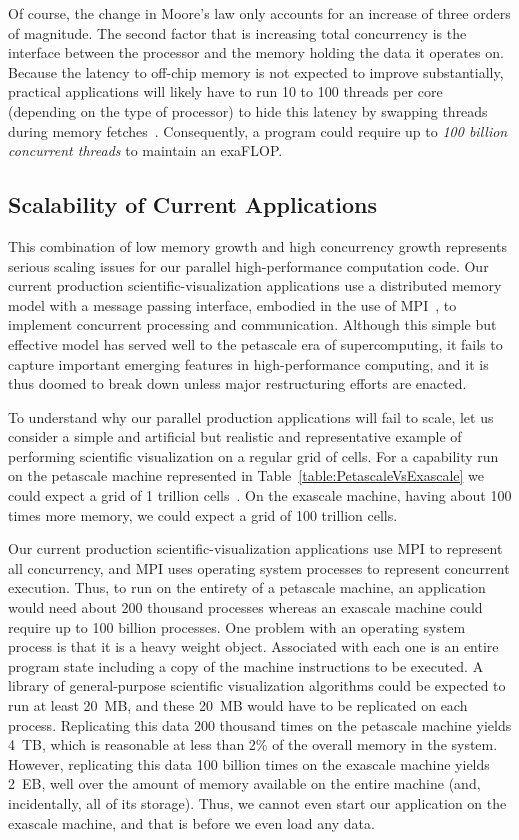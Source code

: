 \documentclass[conference]{IEEEtran}
\newcommand*{\lcite}[1]{~\cite{#1}}
\begin{document}
Of course, the change in Moore's law only accounts for an increase of three
orders of magnitude.  The second factor that is increasing total
concurrency is the interface between the processor and the memory holding
the data it operates on.  Because the latency to off-chip memory is not
expected to improve substantially, practical applications will likely have
to run 10 to 100 threads per core (depending on the type of processor) to
hide this latency by swapping threads during memory
fetches\lcite{ExascaleArchitecturesReport}.  Consequently, a program could
require up to \emph{100 billion concurrent threads} to maintain an
exaFLOP.

\subsection{Scalability of Current Applications}

\noindent
This combination of low memory growth and high concurrency growth
represents serious scaling issues for our parallel high-performance
computation code.  Our current production scientific-visualization
applications use a distributed memory model with a message passing
interface, embodied in the use of MPI\lcite{MPI}, to implement concurrent
processing and communication.  Although this simple but effective model has
served well to the petascale era of supercomputing, it fails to capture
important emerging features in high-performance computing, and it is thus
doomed to break down unless major restructuring efforts are enacted.

To understand why our parallel production applications will fail to scale,
let us consider a simple and artificial but realistic and representative
example of performing scientific visualization on a regular grid of cells.
For a capability run on the petascale machine represented in
Table~\ref{table:PetascaleVsExascale} we could expect a grid of 1 trillion
cells\lcite{Childs2010}.  On the exascale machine, having about 100 times
more memory, we could expect a grid of 100 trillion cells.

Our current production scientific-visualization applications use MPI to
represent all concurrency, and MPI uses operating system processes to
represent concurrent execution.  Thus, to run on the entirety of a
petascale machine, an application would need about 200 thousand processes
whereas an exascale machine could require up to 100 billion processes.  One
problem with an operating system process is that it is a heavy weight
object.  Associated with each one is an entire program state including a
copy of the machine instructions to be executed.  A library of
general-purpose scientific visualization algorithms could be expected to
run at least 20~MB, and these 20~MB would have to be replicated on each
process.  Replicating this data 200 thousand times on the petascale machine
yields 4~TB, which is reasonable at less than 2\% of the overall memory
in the system.  However, replicating this data 100 billion times on the
exascale machine yields 2~EB, well over the amount of memory available on
the entire machine (and, incidentally, all of its storage).  Thus, we cannot
even start our application on the exascale machine, and that is before we
even load any data.
\end{document}
